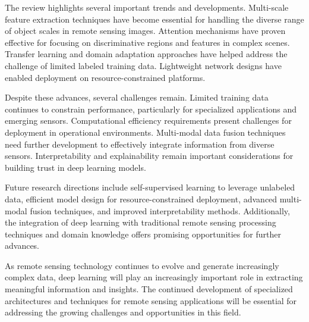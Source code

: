 \documentclass[12pt,a4paper]{article}
\begin{document}
The review highlights several important trends and developments. Multi-scale feature extraction techniques have become essential for handling the diverse range of object scales in remote sensing images. Attention mechanisms have proven effective for focusing on discriminative regions and features in complex scenes. Transfer learning and domain adaptation approaches have helped address the challenge of limited labeled training data. Lightweight network designs have enabled deployment on resource-constrained platforms.

Despite these advances, several challenges remain. Limited training data continues to constrain performance, particularly for specialized applications and emerging sensors. Computational efficiency requirements present challenges for deployment in operational environments. Multi-modal data fusion techniques need further development to effectively integrate information from diverse sensors. Interpretability and explainability remain important considerations for building trust in deep learning models.

Future research directions include self-supervised learning to leverage unlabeled data, efficient model design for resource-constrained deployment, advanced multi-modal fusion techniques, and improved interpretability methods. Additionally, the integration of deep learning with traditional remote sensing processing techniques and domain knowledge offers promising opportunities for further advances.

As remote sensing technology continues to evolve and generate increasingly complex data, deep learning will play an increasingly important role in extracting meaningful information and insights. The continued development of specialized architectures and techniques for remote sensing applications will be essential for addressing the growing challenges and opportunities in this field.
\end{document}
